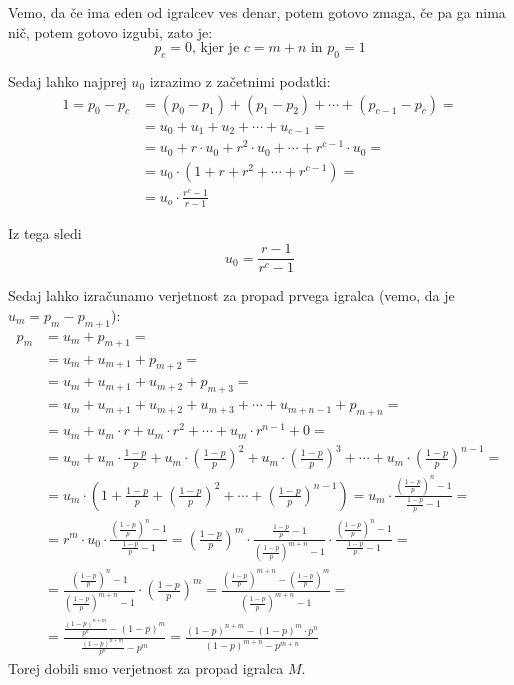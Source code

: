 \documentclass[12pt, a4paper]{article}
\begin{document}
Vemo, da če ima eden od igralcev ves denar, potem gotovo zmaga, če pa ga nima nič, potem gotovo izgubi, zato je:
$$p_c = 0 \textrm{, kjer je } c = m + n \textrm{ in } p_0 = 1$$

Sedaj lahko najprej $u_0$ izrazimo z začetnimi podatki:
\begin{equation*}
\begin{split}
1 = p_0 - p_c &= (p_0 - p_1) + (p_1 - p_2) + \cdots +               (p_{c-1} - p_c) = \\
        &= u_0 + u_1 + u_2 + \cdots + u_{c-1} = \\
        &= u_0 + r \cdot u_0 + r^2 \cdot u_0 + \cdots + r^{c-1} \cdot u_0 = \\
        &= u_0 \cdot (1 + r + r^2 + \cdots + r^{c-1}) = \\
        &= u_o \cdot \frac{r^c - 1}{r-1}
\end{split}
\end{equation*} 

Iz tega sledi $$u_0 = \frac{r-1}{r^c -1}$$

Sedaj lahko izračunamo verjetnost za propad prvega igralca (vemo, da je $u_m = p_m - p_{m+1}$):
\begin{equation*}
\begin{split}
p_m &= u_m + p_{m+1} = \\
    &= u_m + u_{m+1} + p_{m+2} = \\
    &= u_m + u_{m+1} + u_{m+2} + p_{m+3} = \\
    &= u_m + u_{m+1} + u_{m+2} + u_{m+3} + \cdots + u_{m+n-1} + p_{m+n} = \\
    &= u_m + u_m \cdot r + u_m \cdot r^2 + \cdots + u_m \cdot r^{n-1} + 0 = \\
    &= u_m + u_m \cdot \frac{1-p}{p} + u_m \cdot (\frac{1-p}{p})^2 + u_m \cdot (\frac{1-p}{p})^3 + \cdots + u_m \cdot (\frac{1-p}{p})^{n-1} = \\
    &= u_m \cdot (1 + \frac{1-p}{p} + (\frac{1-p}{p})^2 + \cdots + (\frac{1-p}{p})^{n-1}) 
    = u_m \cdot \frac{(\frac{1-p}{p})^n - 1}{\frac{1-p}{p} - 1} = \\
    &= r^m \cdot u_0 \cdot \frac{(\frac{1-p}{p})^n - 1}{\frac{1-p}{p} - 1}  
    = (\frac{1-p}{p})^m \cdot \frac{\frac{1-p}{p} - 1}{(\frac{1-p}{p})^{m+n} -1}\cdot \frac{(\frac{1-p}{p})^n - 1}{\frac{1-p}{p} - 1} = \\
    &= \frac{(\frac{1-p}{p})^n - 1}{(\frac{1-p}{p})^{m+n} -1} \cdot (\frac{1-p}{p})^m 
    = \frac{(\frac{1-p}{p})^{m+n} - (\frac{1-p}{p})^m}{(\frac{1-p}{p})^{m+n} -1} = \\
    &= \frac{\frac{(1-p)^{n+m}}{p^n} - (1-p)^m}{\frac{(1-p)^{n+m}}{p^n} - p^m} = 
    \frac{(1-p)^{n+m} - (1-p)^m \cdot p^n}{(1-p)^{m+n} - p^{m+n}}
\end{split} 
\end{equation*}
Torej dobili smo verjetnost za propad igralca $M$.
\end{document}
